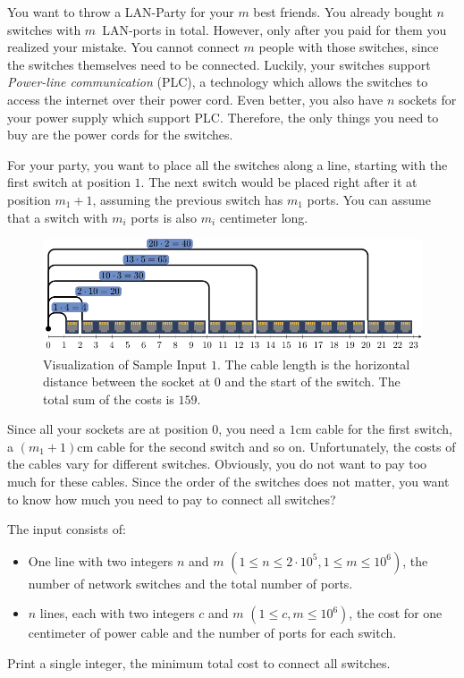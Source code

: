 You want to throw a LAN-Party for your $m$ best friends.
You already bought $n$ switches with $m$~LAN-ports in total.
However, only after you paid for them you realized your mistake.
You cannot connect $m$ people with those switches, since the switches themselves need to be connected.
Luckily, your switches support \emph{Power-line communication} (PLC), a technology which allows the switches to access the internet over their power cord.
Even better, you also have $n$ sockets for your power supply which support PLC.
Therefore, the only things you need to buy are the power cords for the switches.

For your party, you want to place all the switches along a line, starting with the first switch at position $1$.
The next switch would be placed right after it at position $m_1+1$, assuming the previous switch has $m_1$ ports.
You can assume that a switch with $m_i$ ports is also $m_i$ centimeter long.

\begin{figure}[h]
	\centering
	\includegraphics{sample}
	\caption{Visualization of Sample Input $1$.
		The cable length is the horizontal distance between the socket at $0$ and the start of the switch.
		The total sum of the costs is $159$.}
\end{figure}

Since all your sockets are at position $0$, you need a $1$cm cable for the first switch, a $(m_1+1)$cm cable for the second switch and so on.
Unfortunately, the costs of the cables vary for different switches.
Obviously, you do not want to pay too much for these cables.
Since the order of the switches does not matter, you want to know how much you need to pay to connect all switches?

\begin{Input}
	The input consists of:
	\begin{itemize}
		\item One line with two integers $n$ and $m$ $(1\leq n \leq 2\cdot10^5, 1\leq m \leq10^6)$,
			the number of network switches and the total number of ports.
		\item $n$ lines, each with two integers $c$ and $m$ $(1\leq c,m \leq
			10^6)$, the cost for one centimeter of power cable and the number of
			ports for each switch.
	\end{itemize}
\end{Input}

\begin{Output}
	Print a single integer, the minimum total cost to connect all switches.
\end{Output}

